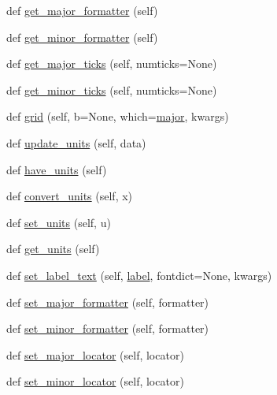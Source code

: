 \begin{DoxyCompactItemize}
def \hyperlink{classmatplotlib_1_1axis_1_1Axis_adbdf831c075eb3c2a3120aa1e4c8aeac}{get\+\_\+major\+\_\+formatter} (self)
\item 
def \hyperlink{classmatplotlib_1_1axis_1_1Axis_af0ba11cfae4c741d2d2ada6cb1dadb10}{get\+\_\+minor\+\_\+formatter} (self)
\item 
def \hyperlink{classmatplotlib_1_1axis_1_1Axis_a67ef6a02580550302abc1b27b880f8c0}{get\+\_\+major\+\_\+ticks} (self, numticks=None)
\item 
def \hyperlink{classmatplotlib_1_1axis_1_1Axis_af42124289f35cdf18ea5f3f385b98cbf}{get\+\_\+minor\+\_\+ticks} (self, numticks=None)
\item 
def \hyperlink{classmatplotlib_1_1axis_1_1Axis_a39bd336dbfc743de9eed3f82d294ff96}{grid} (self, b=None, which=\textquotesingle{}\hyperlink{classmatplotlib_1_1axis_1_1Axis_a349fa77c014c5e44f472634075372df2}{major}\textquotesingle{}, kwargs)
\item 
def \hyperlink{classmatplotlib_1_1axis_1_1Axis_a1cf98f6edcd003fccaf91ba7fbb21cc4}{update\+\_\+units} (self, data)
\item 
def \hyperlink{classmatplotlib_1_1axis_1_1Axis_aea3d6db5d212968216ecc63c9615e5a3}{have\+\_\+units} (self)
\item 
def \hyperlink{classmatplotlib_1_1axis_1_1Axis_a74ece99d52268f22e85b36de85636c3e}{convert\+\_\+units} (self, x)
\item 
def \hyperlink{classmatplotlib_1_1axis_1_1Axis_a84cf0815055acf98bfc3e5b7c73e2e63}{set\+\_\+units} (self, u)
\item 
def \hyperlink{classmatplotlib_1_1axis_1_1Axis_acac9660939c5ae994518831b421d9957}{get\+\_\+units} (self)
\item 
def \hyperlink{classmatplotlib_1_1axis_1_1Axis_aa3d94188ab475820feee45ffb380b435}{set\+\_\+label\+\_\+text} (self, \hyperlink{classmatplotlib_1_1axis_1_1Axis_a2a176cae6b3bf1765db699f93604ac77}{label}, fontdict=None, kwargs)
\item 
def \hyperlink{classmatplotlib_1_1axis_1_1Axis_a0f6fad84ea6b470d82c7bb851a838f87}{set\+\_\+major\+\_\+formatter} (self, formatter)
\item 
def \hyperlink{classmatplotlib_1_1axis_1_1Axis_a023626a604db3398916697564679b72b}{set\+\_\+minor\+\_\+formatter} (self, formatter)
\item 
def \hyperlink{classmatplotlib_1_1axis_1_1Axis_a1e8703fe33a365026e550df622f59552}{set\+\_\+major\+\_\+locator} (self, locator)
\item 
def \hyperlink{classmatplotlib_1_1axis_1_1Axis_a78859a1dd1527f3fd24e194b56caffff}{set\+\_\+minor\+\_\+locator} (self, locator)

\end{DoxyCompactItemize}
